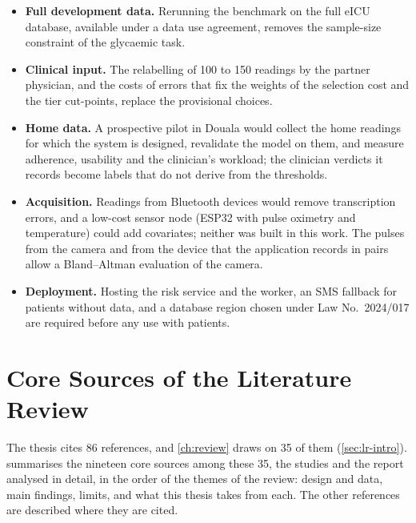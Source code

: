 \documentclass[11pt,a4paper,oneside]{report}
\begin{document}
\begin{itemize}
  \item \textbf{Full development data.} Rerunning the benchmark on the full eICU database, available under a data use agreement, removes the sample-size constraint of the glycaemic task.
  \item \textbf{Clinical input.} The relabelling of 100 to 150 readings by the partner physician, and the costs of errors that fix the weights of the selection cost and the tier cut-points, replace the provisional choices.
  \item \textbf{Home data.} A prospective pilot in Douala would collect the home readings for which the system is designed, revalidate the model on them, and measure adherence, usability and the clinician's workload; the clinician verdicts it records become labels that do not derive from the thresholds.
  \item \textbf{Acquisition.} Readings from Bluetooth devices would remove transcription errors, and a low-cost sensor node (ESP32 with pulse oximetry and temperature) could add covariates; neither was built in this work. The pulses from the camera and from the device that the application records in pairs allow a Bland--Altman evaluation of the camera.
  \item \textbf{Deployment.} Hosting the risk service and the worker, an SMS fallback for patients without data, and a database region chosen under Law No.~2024/017 are required before any use with patients.
\end{itemize}



\cleardoublepage
{}
\printbibliography[title={References}]


\appendix{}

\chapter{Core Sources of the Literature Review}\label{app:sources}

The thesis cites 86 references, and \cref{ch:review} draws on 35 of them (\cref{sec:lr-intro}).  summarises the nineteen core sources among these 35, the studies and the report analysed in detail, in the order of the themes of the review: design and data, main findings, limits, and what this thesis takes from each. The other references are described where they are cited.
\end{document}
